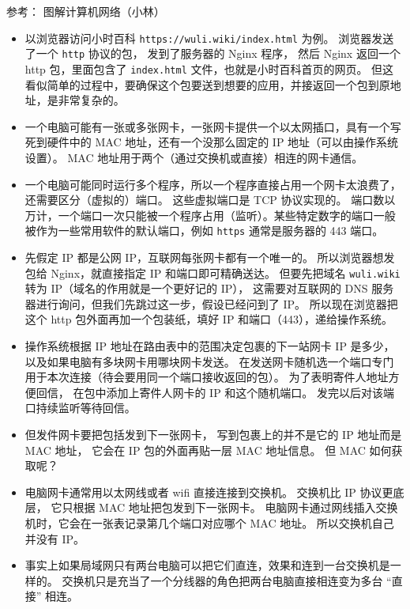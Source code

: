 
\begin{issues}
\issueDraft
\end{issues}

参考： 图解计算机网络（小林）

\begin{itemize}
\item 以浏览器访问小时百科 \verb`https://wuli.wiki/index.html` 为例。 浏览器发送了一个 \verb`http` 协议的包， 发到了服务器的 Nginx 程序， 然后 Nginx 返回一个 http 包，里面包含了 \verb`index.html` 文件，也就是小时百科首页的网页。 但这看似简单的过程中，要确保这个包要送到想要的应用，并接返回一个包到原地址，是非常复杂的。
\item 一个电脑可能有一张或多张网卡，一张网卡提供一个以太网插口，具有一个写死到硬件中的 MAC 地址，还有一个没那么固定的 IP 地址（可以由操作系统设置）。 MAC 地址用于两个（通过交换机或直接）相连的网卡通信。
\item 一个电脑可能同时运行多个程序，所以一个程序直接占用一个网卡太浪费了，还需要区分（虚拟的）端口。 这些虚拟端口是 TCP 协议实现的。 端口数以万计，一个端口一次只能被一个程序占用（监听）。某些特定数字的端口一般被作为一些常用软件的默认端口，例如 \verb`https` 通常是服务器的 443 端口。
\item 先假定 IP 都是公网 IP，互联网每张网卡都有一个唯一的。 所以浏览器想发包给 Nginx，就直接指定 IP 和端口即可精确送达。 但要先把域名 \verb`wuli.wiki` 转为 IP（域名的作用就是一个更好记的 IP）， 这需要对互联网的 DNS 服务器进行询问，但我们先跳过这一步，假设已经问到了 IP。 所以现在浏览器把这个 http 包外面再加一个包装纸，填好 IP 和端口（443），递给操作系统。
\item 操作系统根据 IP 地址在路由表中的范围决定包裹的下一站网卡 IP 是多少， 以及如果电脑有多块网卡用哪块网卡发送。 在发送网卡随机选一个端口专门用于本次连接（待会要用同一个端口接收返回的包）。 为了表明寄件人地址方便回信， 在包中添加上寄件人网卡的 IP 和这个随机端口。 发完以后对该端口持续监听等待回信。
\item 但发件网卡要把包括发到下一张网卡， 写到包裹上的并不是它的 IP 地址而是 MAC 地址， 它会在 IP 包的外面再贴一层 MAC 地址信息。 但 MAC 如何获取呢？
\item 电脑网卡通常用以太网线或者 wifi 直接连接到交换机。 交换机比 IP 协议更底层， 它只根据 MAC 地址把包发到下一张网卡。 电脑网卡通过网线插入交换机时，它会在一张表记录第几个端口对应哪个 MAC 地址。 所以交换机自己并没有 IP。
\item 事实上如果局域网只有两台电脑可以把它们直连，效果和连到一台交换机是一样的。 交换机只是充当了一个分线器的角色把两台电脑直接相连变为多台 “直接” 相连。

\end{itemize}
